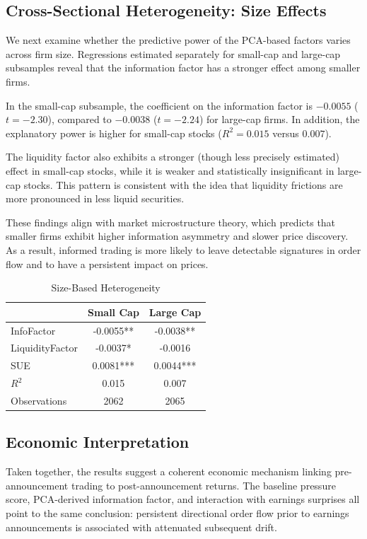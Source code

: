 \subsection{Cross-Sectional Heterogeneity: Size Effects}

We next examine whether the predictive power of the PCA-based factors varies across firm size. Regressions estimated separately for small-cap and large-cap subsamples reveal that the information factor has a stronger effect among smaller firms.

In the small-cap subsample, the coefficient on the information factor is $-0.0055$ ($t = -2.30$), compared to $-0.0038$ ($t = -2.24$) for large-cap firms. In addition, the explanatory power is higher for small-cap stocks ($R^2 = 0.015$ versus $0.007$).

The liquidity factor also exhibits a stronger (though less precisely estimated) effect in small-cap stocks, while it is weaker and statistically insignificant in large-cap stocks. This pattern is consistent with the idea that liquidity frictions are more pronounced in less liquid securities.

These findings align with market microstructure theory, which predicts that smaller firms exhibit higher information asymmetry and slower price discovery. As a result, informed trading is more likely to leave detectable signatures in order flow and to have a persistent impact on prices.
\begin{table}[!t]
\centering
\caption{Size-Based Heterogeneity}
\label{tab:size_split}
\begin{tabular}{lcc}
\hline
 & Small Cap & Large Cap \\
\hline
InfoFactor & -0.0055** & -0.0038** \\
LiquidityFactor & -0.0037* & -0.0016 \\
SUE & 0.0081*** & 0.0044*** \\
$R^2$ & 0.015 & 0.007 \\
Observations & 2062 & 2065 \\
\hline
\end{tabular}
\end{table}

\subsection{Economic Interpretation}

Taken together, the results suggest a coherent economic mechanism linking pre-announcement trading to post-announcement returns. The baseline pressure score, PCA-derived information factor, and interaction with earnings surprises all point to the same conclusion: persistent directional order flow prior to earnings announcements is associated with attenuated subsequent drift.

